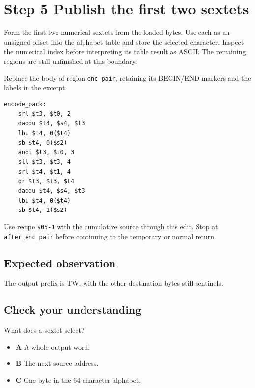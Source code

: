 \section{Step 5 Publish the first two sextets}\label{base64-s05}

Form the first two numerical sextets from the loaded bytes. Use each as an unsigned offset into the alphabet table and store the selected character. Inspect the numerical index before interpreting its table result as ASCII. The remaining regions are still unfinished at this boundary.

Replace the body of region \texttt{enc\_pair}, retaining its BEGIN/END markers and the labels in the excerpt.

\begin{verbatim}
encode_pack:
    srl $t3, $t0, 2
    daddu $t4, $s4, $t3
    lbu $t4, 0($t4)
    sb $t4, 0($s2)
    andi $t3, $t0, 3
    sll $t3, $t3, 4
    srl $t4, $t1, 4
    or $t3, $t3, $t4
    daddu $t4, $s4, $t3
    lbu $t4, 0($t4)
    sb $t4, 1($s2)
\end{verbatim}

Use recipe \texttt{s05-1} with the cumulative source through this edit. Stop at \texttt{after\_enc\_pair} before continuing to the temporary or normal return.

\subsection{Expected observation}
The output prefix is TW, with the other destination bytes still sentinels.

\subsection{Check your understanding}
What does a sextet select?

\begin{itemize}
  \item \textbf{A} A whole output word.
  \item \textbf{B} The next source address.
  \item \textbf{C} One byte in the 64-character alphabet.
\end{itemize}
